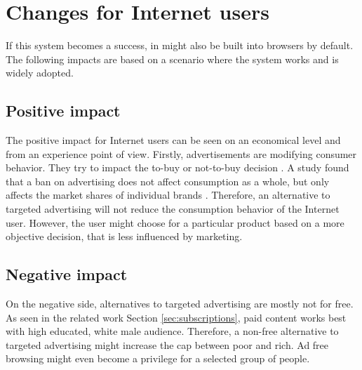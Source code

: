 \section{Changes for Internet users}
If this system becomes a success, in might also be built into browsers by default. The following impacts are based on a scenario where the system works and is widely adopted. 

\subsection{Positive impact}
The positive impact for Internet users can be seen on an economical level and from an experience point of view. Firstly, advertisements are modifying consumer behavior. They try to impact the to-buy or not-to-buy decision \cite{johnson2007consumer}. A study found that a ban on advertising does not affect consumption as a whole, but only affects the market shares of individual brands \cite{advertisementsconsumption}. Therefore, an alternative to targeted advertising will not reduce the consumption behavior of the Internet user. However, the user might choose for a particular product based on a more objective decision, that is less influenced by marketing.

\subsection{Negative impact}
On the negative side, alternatives to targeted advertising are mostly not for free. As seen in the related work Section \ref{sec:subscriptions}, paid content works best with high educated, white male audience. Therefore, a non-free alternative to targeted advertising might increase the cap between poor and rich. Ad free browsing might even become a privilege for a selected group of people.

